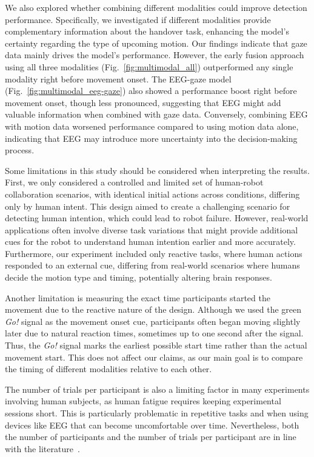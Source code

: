 We also explored whether combining different modalities could improve detection performance. Specifically, we investigated if different modalities provide complementary information about the handover task, enhancing the model's certainty regarding the type of upcoming motion. Our findings indicate that gaze data mainly drives the model's performance. However, the early fusion approach using all three modalities (Fig.~\ref{fig:multimodal_all}) outperformed any single modality right before movement onset. The EEG-gaze model (Fig.~\ref{fig:multimodal_eeg-gaze}) also showed a performance boost right before movement onset, though less pronounced, suggesting that EEG might add valuable information when combined with gaze data. Conversely, combining EEG with motion data worsened performance compared to using motion data alone, indicating that EEG may introduce more uncertainty into the decision-making process.

Some limitations in this study should be considered when interpreting the results. First, we only considered a controlled and limited set of human-robot collaboration scenarios, with identical initial actions across conditions, differing only by human intent. This design aimed to create a challenging scenario for detecting human intention, which could lead to robot failure. However, real-world applications often involve diverse task variations that might provide additional cues for the robot to understand human intention earlier and more accurately. Furthermore, our experiment included only reactive tasks, where human actions responded to an external cue, differing from real-world scenarios where humans decide the motion type and timing, potentially altering brain responses.

Another limitation is measuring the exact time participants started the movement due to the reactive nature of the design. Although we used the green \emph{Go!} signal as the movement onset cue, participants often began moving slightly later due to natural reaction times, sometimes up to one second after the signal. Thus, the \emph{Go!} signal marks the earliest possible start time rather than the actual movement start. This does not affect our claims, as our main goal is to compare the timing of different modalities relative to each other.

The number of trials per participant is also a limiting factor in many experiments involving human subjects, as human fatigue requires keeping experimental sessions short. This is particularly problematic in repetitive tasks and when using devices like EEG that can become uncomfortable over time. Nevertheless, both the number of participants and the number of trials per participant are in line with the literature~\cite{cooper20, BUERKLE2021}. 

